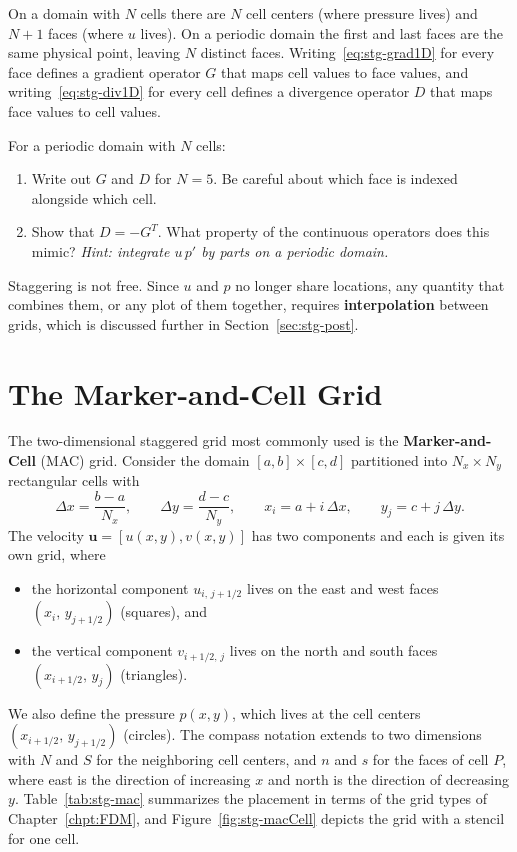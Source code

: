 On a domain with $N$ cells there are $N$ cell centers (where pressure lives) and $N + 1$ faces (where $u$ lives). On a periodic domain the first and last faces are the same physical point, leaving $N$ distinct faces. Writing~\eqref{eq:stg-grad1D} for every face defines a gradient operator $G$ that maps cell values to face values, and writing~\eqref{eq:stg-div1D} for every cell defines a divergence operator $D$ that maps face values to cell values.

\begin{exercise}
For a periodic domain with $N$ cells:
\begin{enumerate}[label=(\alph*)]
    \item Write out $G$ and $D$ for $N=5$. Be careful about which face is indexed alongside which cell.
    \item Show that $D = -G^T$. What property of the continuous operators does this mimic? \emph{Hint: integrate $u\,p'$ by parts on a periodic domain.}
\end{enumerate}
\end{exercise}

\begin{remark}
Staggering is not free. Since $u$ and $p$ no longer share locations, any quantity that combines them, or any plot of them together, requires \textbf{interpolation} between grids, which is discussed further in Section~\ref{sec:stg-post}.
\end{remark}

\section{The Marker-and-Cell Grid}
\label{sec:mac}

The two-dimensional staggered grid most commonly used is the \textbf{Marker-and-Cell} (MAC) grid. Consider the domain $[a,b]\times[c,d]$ partitioned into $N_x \times N_y$ rectangular cells with
$$
\Delta x = \frac{b-a}{N_x}, \qquad \Delta y = \frac{d-c}{N_y}, \qquad x_i = a + i\,\Delta x, \qquad y_j = c + j\,\Delta y.
$$
The velocity $\mathbf{u} = [u(x,y), v(x,y)]$ has two components and each is given its own grid, where
\begin{itemize}
    \item the horizontal component $u_{i,\,j+1/2}$ lives on the east and west faces $(x_i,\,y_{j+1/2})$ (squares), and
    \item the vertical component $v_{i+1/2,\,j}$ lives on the north and south faces $(x_{i+1/2},\,y_j)$ (triangles).
\end{itemize}
We also define the pressure $p(x,y)$, which lives at the cell centers $(x_{i+1/2},\,y_{j+1/2})$ (circles). The compass notation extends to two dimensions with $N$ and $S$ for the neighboring cell centers, and $n$ and $s$ for the faces of cell $P$, where east is the direction of increasing $x$ and north is the direction of decreasing $y$. Table~\ref{tab:stg-mac} summarizes the placement in terms of the grid types of Chapter~\ref{chpt:FDM}, and Figure~\ref{fig:stg-macCell} depicts the grid with a stencil for one cell.

